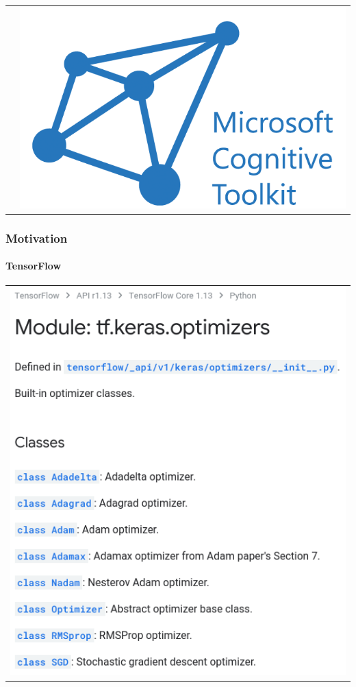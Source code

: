 \documentclass{beamer}
\begin{document}
\begin{frame}
\begin{table}[]
\begin{tabular}{c|c}
     &     \includegraphics[scale=0.2]{cntk-logo.png}
\\
        \end{tabular}
        \label{tab:logos-motivation}
    \end{table}
    
\end{frame}
  
\begin{frame}
    \frametitle{Motivation}
    \framesubtitle{TensorFlow}
    
    \begin{table}
        \centering
        \begin{tabular}{c}
        \includegraphics[scale=0.3]{tf-keras-optimizers.png}
 \\
        \end{tabular}
        \label{tab:tf-motivation}
    \end{table}
    
\end{frame}
\end{document}
